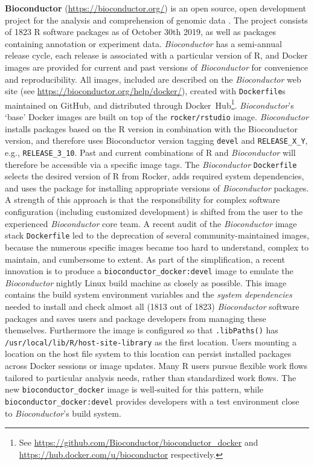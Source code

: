 \textbf{Bioconductor} (\url{https://bioconductor.org/}) is an open
source, open development project for the analysis and comprehension of
genomic data \citep{gentleman_bioconductor_2004}. The project consists
of 1823 R software packages as of October 30th 2019, as well as packages
containing annotation or experiment data. \emph{Bioconductor} has a
semi-annual release cycle, each release is associated with a particular
version of R, and Docker images are provided for current and past
versions of \emph{Bioconductor} for convenience and reproducibility. All
images, included are described on the \emph{Bioconductor} web site (see
\url{https://bioconductor.org/help/docker/}), created with
\texttt{Dockerfile}s maintained on GitHub, and distributed through
Docker~Hub\footnote{See \href{https://github.com/Bioconductor/bioconductor_docker}{https://github.com/Bioconductor/bioconductor\_docker} and \href{https://hub.docker.com/u/bioconductor}{https://hub.docker.com/u/bioconductor} respectively.}.
\emph{Bioconductor}'s `base' Docker images are built on top of the
\texttt{rocker/rstudio} image. \emph{Bioconductor} installs packages
based on the R version in combination with the Bioconductor version, and
therefore uses Bioconductor version tagging \texttt{devel} and
\texttt{RELEASE\_X\_Y}, e.g., \texttt{RELEASE\_3\_10}. Past and current
combinations of R and \emph{Bioconductor} will therefore be accessible
via a specific image tags. The \emph{Bioconductor} \texttt{Dockerfile}
selects the desired version of R from Rocker, adds required system
dependencies, and uses the  package for installing
appropriate versions of \emph{Bioconductor} packages. A strength of this
approach is that the responsibility for complex software configuration
(including customized development) is shifted from the user to the
experienced \emph{Bioconductor} core team. A recent audit of the
\emph{Bioconductor} image stack \texttt{Dockerfile} led to the
deprecation of several community-maintained images, because the numerous
specific images became too hard to understand, complex to maintain, and
cumbersome to extent. As part of the simplification, a recent innovation
is to produce a \texttt{bioconductor\_docker:devel} image to emulate the
\emph{Bioconductor} nightly Linux build machine as closely as possible.
This image contains the build system environment variables and the
\emph{system dependencies} needed to install and check almost all (1813
out of 1823) \emph{Bioconductor} software packages and saves users and
package developers from managing these themselves. Furthermore the image
is configured so that \texttt{.libPaths()} has
\texttt{/usr/local/lib/R/host-site-library} as the first location. Users
mounting a location on the host file system to this location can persist
installed packages across Docker sessions or image updates. Many R users
pursue flexible work flows tailored to particular analysis needs, rather
than standardized work flows. The new \texttt{bioconductor\_docker}
image is well-suited for this pattern, while
\texttt{bioconductor\_docker:devel} provides developers with a test
environment close to \emph{Bioconductor}'s build system.

